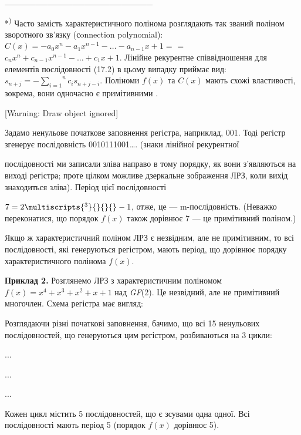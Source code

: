 \bigskip

\_\_\_\_\_\_\_\_\_\_\_\_\_\_\_\_\_\_\_\_\_\_\_\_

*\textsuperscript{)} Часто замість характеристичного полінома розглядають так
званий поліном зворотного зв’язку (сonnection polynomial): 
$C(x)=-a_{0}x^{n}-a_1x^{n-1}-\dots-a_{n-1}x+1=$
= $c_{n}x^{n}+c_{n-1}x^{n-1}-\dots+c_1x+1$.
Лінійне рекурентне співвідношення для елементів послідовності  (17.2) в цьому
випадку приймає вид:  ${s_{n+j}=-\overset{n}{\underset{i=1}{\sum
}}{c_{i}s_{n+j-i}}}$. Поліноми  $f(x)$ та  $C(x)$ мають схожі
властивості, зокрема, вони одночасно є примітивними .

[Warning: Draw object ignored]

Задамо ненульове початкове заповнення регістра, наприклад, 001. Тоді регістр
згенерує послідовність 0010111001…. (знаки лінійної рекурентної 

послідовності ми записали зліва направо в тому порядку, як вони з’являються на
виході регістра; проте цілком можливе дзеркальне зображення ЛРЗ, коли вихід
знаходиться зліва). Період цієї послідовності 

 $7=2\multiscripts{^{3}}{}{}{\text{}}-1$, отже, це --- m{}-послідовність.
(Неважко переконатися, що порядок  $f(x)$ також дорівнює 7 --- це примітивний
поліном.)

Якщо ж характеристичний поліном ЛРЗ є незвідним, але не примітивним, то всі
послідовності, які генеруються регістром, мають період, що дорівнює порядку
характеристичного полінома  $f(x)$.

\textbf{Приклад 2.} Розглянемо ЛРЗ з характеристичним поліномом 
$f(x)=x^{4}+x^{3}+x^2+x+1$ над \textit{GF}(2). Це незвідний, але не
примітивний многочлен. Схема регістра має вигляд:

{\par}

Розглядаючи різні початкові заповнення, бачимо, що всі 15 ненульових
послідовностей, що генеруються цим регістром, розбиваються на 3 цикли:

{...
\par}

{...
\par}

{...
\par}

Кожен цикл містить 5 послідовностей, що є зсувами одна одної. Всі послідовності
мають період 5 (порядок  $f(x)$ дорівнює 5).

